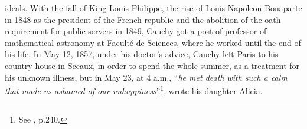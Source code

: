 ideals. With the fall of King Louis Philippe, the rise of Louis Napoleon Bonaparte in 1848 as the president of the French republic and the abolition of the oath requirement for public servers in 1849, Cauchy got a post of professor of mathematical astronomy at Facult\'e de Sciences, where he worked until the end of his life. In May 12, 1857, under his doctor's advice, Cauchy left Paris to his country house in Sceaux, in order to spend the whole summer, as a treatment for his unknown illness, but in May 23, at 4 a.m., ``\emph{he met death with such a calm that made us ashamed of our unhappiness}''\footnote{See \cite{belhoste_1991_1}, p.240.}, wrote his daughter Alicia. 
\begin{figure}[!ht]
	\centering
	\begin{center}
	\end{center}
	\label{fg:cauchyPortrai}
\end{figure}  


